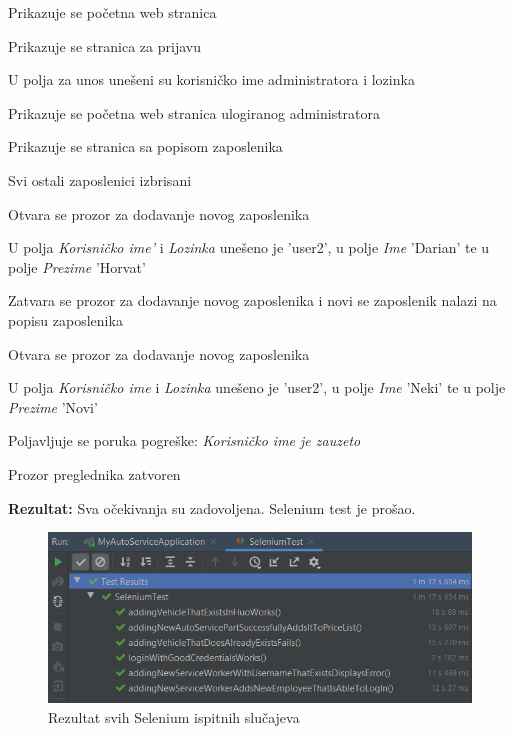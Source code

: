 			\begin{packed_enum}
				
				\item Prikazuje se početna web stranica
				\item Prikazuje se stranica za prijavu
				\item U polja za unos unešeni su korisničko ime administratora i lozinka
				\item Prikazuje se početna web stranica ulogiranog administratora
				\item Prikazuje se stranica sa popisom zaposlenika
				\item Svi ostali zaposlenici izbrisani
				\item Otvara se prozor za dodavanje novog zaposlenika
				\item U polja \textit{Korisničko ime'} i \textit{Lozinka} unešeno je 'user2', u polje \textit{Ime} 'Darian' te u polje \textit{Prezime} 'Horvat'
				\item Zatvara se prozor za dodavanje novog zaposlenika i novi se zaposlenik nalazi na popisu zaposlenika
				\item Otvara se prozor za dodavanje novog zaposlenika
				\item U polja \textit{Korisničko ime} i \textit{Lozinka} unešeno je 'user2', u polje \textit{Ime} 'Neki' te u polje \textit{Prezime} 'Novi'
				\item Poljavljuje se poruka pogreške: \textit{Korisničko ime je zauzeto}
				\item Prozor preglednika zatvoren
				
			\end{packed_enum}
			
			\noindent\textbf{Rezultat:} Sva očekivanja su zadovoljena. Selenium test je prošao.
			
			\hfill\break
			
			\begin{figure}[H]
				\includegraphics[scale=0.9]{slike/Selenium_test_results.png}
				\centering
				\caption{Rezultat svih Selenium ispitnih slučajeva}
				\label{fig:seleniumtestresults}
			\end{figure}
			
